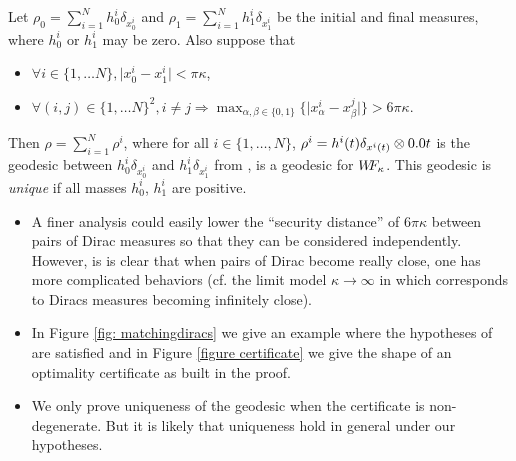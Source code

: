 \begin{theorem}
Let $\rho_0 = \sum_{i=1}^N h_0^i \delta_{x^i_0}$ and $\rho_1 = \sum_{i=1}^N h^i_1 \delta_{x^i_1}$ be the initial and final measures, where $h^i_0$ or $h^i_1$ may be zero. Also suppose that 
\begin{itemize}
\item $\forall i \in \{1,\dots N \}, \vert x^i_0-x^i_1 \vert < \pi \kappa$,
\item $\forall (i,j) \in \{1,\dots N \}^2, i\neq j \Rightarrow \max_{\alpha,\beta \in \{0,1\}}\{\vert x^i_{\alpha}-x^j_{\beta} \vert\} > 6\pi \kappa$. 
\end{itemize}
Then $\rho = \sum_{i=1}^N \rho^i$, where for all $i\in \{1, \dots, N \}$, $\rho^i = h^i(t) \delta_{x^i(t)} \otimes \d t$ is the geodesic between $h^i_0 \delta_{x^i_0}$ and $h^i_1 \delta_{x^i_1}$ from , is a geodesic for $W\! \! F_{\kappa}$. This geodesic is \emph{unique} if all masses $h_0^i$, $h_1^i$ are positive.
\end{theorem}

\begin{remarks} \mbox{}
\begin{itemize}
\item A finer analysis could easily lower the ``security distance'' of $6\pi \kappa$ between pairs of Dirac measures so that they can be considered independently. However, is is clear that when pairs of Dirac become really close, one has more complicated behaviors (cf. the limit model $\kappa\to \infty$ in  which corresponds to Diracs measures becoming infinitely close).
\item In Figure \ref{fig: matchingdiracs} we give an example where the hypotheses of  are satisfied and in Figure \ref{figure certificate} we give the shape of an optimality certificate as built in the proof. 
\item We only prove uniqueness of the geodesic when the certificate is non-degenerate. But it is likely that uniqueness hold in general under our hypotheses.
\end{itemize}
\end{remarks}

